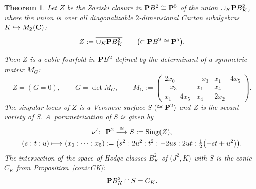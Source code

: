 \documentclass[pdftex]{sigma}
\numberwithin{equation}{section}
\newtheorem{Theorem}{Theorem}[section]
\begin{document}
\begin{Theorem} \label{thmz}
Let $Z$ be the Zariski closure in ${\bf P} B^2\cong{\bf P}^5$ of the union
$\cup_K {\bf P} B^2_K$, where the union is over all
diagonalizable $2$-dimensional Cartan subalgebras $K\hookrightarrow M_2({\bf C})$:
\[
Z := \overline{\cup_K {\bf P} B^2_K}\qquad\big(\!\!\subset {\bf P} B^2 \cong {\bf P}^5\big).
\]

Then $Z$ is a cubic fourfold in ${\bf P} B^2$ defined by
the determinant of a symmetric matrix $M_G$:
\[
Z = (G=0),\qquad
G = \det M_G,\qquad
M_G := \left(\begin{matrix}
2x_0&-x_3&x_1-4x_5\\
-x_3&x_1&x_4\\
x_1-4x_5&x_4&2x_2
\end{matrix}\right).
\]
The singular locus of $Z$ is a Veronese surface $S\;(\cong{\bf P}^2)$ and $Z$ is the secant variety of $S$.
A~parametrization of $S$ is given by
\begin{gather*}
\nu' \colon \ {\bf P}^2 \stackrel{\cong}{\longrightarrow} S := \operatorname{Sing}(Z),\\
(s:t:u)\longmapsto (x_0:\dots:x_5):=
\big(s^2: 2u^2:t^2: -2us: 2ut: \tfrac{1}{2}\big({-}st + u^2\big)\big).
\end{gather*}
The intersection of the space of Hodge classes $B^2_K$ of $\big(J^2,K\big)$ with $S$ is the conic
$C_K$ from Proposition~{\rm \ref{conicCK}}:
\[
{\bf P} B^2_K \cap S = C_K.
\]
\end{Theorem}
\end{document}
